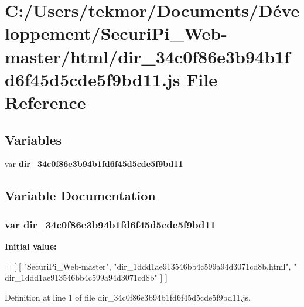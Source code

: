 \section{C\+:/\+Users/tekmor/\+Documents/\+Développement/\+Securi\+Pi\+\_\+\+Web-\/master/html/dir\+\_\+34c0f86e3b94b1fd6f45d5cde5f9bd11.js File Reference}
\label{dir__34c0f86e3b94b1fd6f45d5cde5f9bd11_8js}
\subsection*{Variables}
\begin{DoxyCompactItemize}
\item 
var {\bf dir\+\_\+34c0f86e3b94b1fd6f45d5cde5f9bd11}
\end{DoxyCompactItemize}


\subsection{Variable Documentation}
\subsubsection[{dir\+\_\+34c0f86e3b94b1fd6f45d5cde5f9bd11}]{\setlength{\rightskip}{0pt plus 5cm}var dir\+\_\+34c0f86e3b94b1fd6f45d5cde5f9bd11}\label{dir__34c0f86e3b94b1fd6f45d5cde5f9bd11_8js_ad8d5676eb53dba96a61e8340bd2a4395}
{\bfseries Initial value\+:}
\begin{DoxyCode}
=
[
    [ \textcolor{stringliteral}{"SecuriPi\_Web-master"}, \textcolor{stringliteral}{"dir\_1ddd1ae913546bb4c599a94d3071cd8b.html"}, \textcolor{stringliteral}{"
      dir\_1ddd1ae913546bb4c599a94d3071cd8b"} ]
]
\end{DoxyCode}


Definition at line 1 of file dir\+\_\+34c0f86e3b94b1fd6f45d5cde5f9bd11.\+js.

